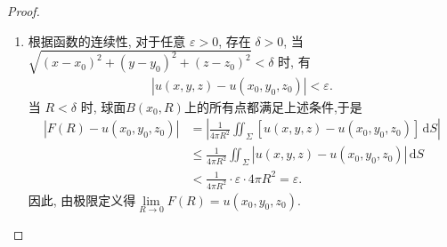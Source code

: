 \documentclass[../../main.tex]{subfiles}%
\begin{document}
\begin{proof}
\begin{enumerate}[(1)]
\item 根据函数的连续性, 对于任意 \(\varepsilon > 0\), 存在 \(\delta > 0\), 当 \(\sqrt{(x-x_0)^2 + (y-y_0)^2 + (z-z_0)^2} < \delta\) 时, 有
\begin{align*}
|u(x, y, z) - u(x_0, y_0, z_0)| < \varepsilon.
\end{align*}
当 \(R < \delta\) 时, 球面$B(x_0,R)$上的所有点都满足上述条件,于是
\begin{align*}
\left|F(R) - u(x_0, y_0, z_0)\right| &= \left| \frac{1}{4\pi R^2} \iint_{\Sigma} \left[u(x, y, z) - u(x_0, y_0, z_0)\right]\, \mathrm{d}S \right| \\
&\leqslant \frac{1}{4\pi R^2} \iint_{\Sigma} \left|u(x, y, z) - u(x_0, y_0, z_0)\right|\, \mathrm{d}S \\
&< \frac{1}{4\pi R^2} \cdot \varepsilon \cdot 4\pi R^2 = \varepsilon .
\end{align*}
因此, 由极限定义得\(\lim\limits_{R \to 0} F(R) = u(x_0, y_0, z_0)\).


\end{enumerate}
\end{proof}
\end{document}
